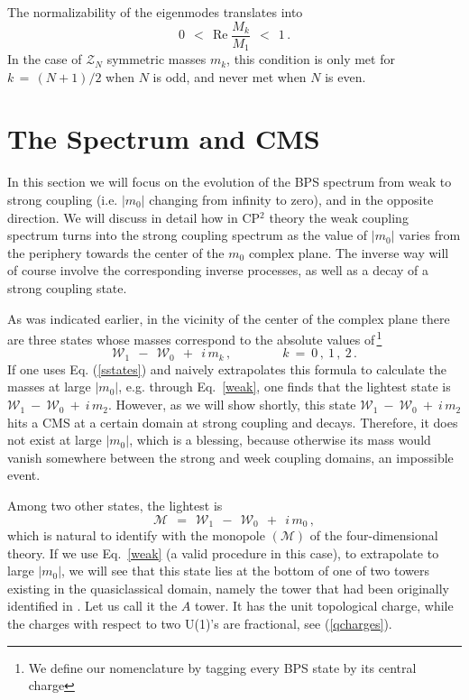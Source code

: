 \documentclass[epsfig,12pt]{article}
\def\beq{\begin{equation}}
\def\eeq{\end{equation}}
\def\beq{\begin{equation}}
\def\eeq{\end{equation}}
\newcommand{\mc}[1]{\mathcal{#1}}
\newcommand{\W}{\mathcal{W}}
\newcommand{\M}{\mathcal{M}}
\begin{document}
	The normalizability of the eigenmodes translates into
\beq
\label{norm}
	0 ~~<~~ \text{Re}\; \frac{ M_k }
                                 { M_1 } ~~<~~ 1\,.
\eeq
	In the case of $ \mc{Z}_N $ symmetric masses $ m_k $, this condition is only met for $ k \,=\, (N+1)/2 $
	when $ N $ is odd, and never met when $ N $ is even.


\newpage
\section{The Spectrum and CMS}
\label{secspectrum}
\setcounter{equation}{0}

	In this section we will focus on the
	evolution of the BPS spectrum from weak to strong coupling (i.e. $|m_0|$ changing from infinity to zero),
	and in the opposite direction.
	We will discuss in detail how in CP$^2$ theory the weak coupling  
	spectrum turns into the strong  coupling  
	spectrum as the value of  $| m_0| $ varies 
	from the periphery towards the center of the $ m_0 $ complex plane.
	The inverse way will of course involve the corresponding inverse processes, as well as a decay of a 
	strong coupling state.

	As was indicated earlier, in the vicinity of the center of the complex plane there are three states
	whose masses correspond to the absolute values of\,\footnote{We define our nomenclature by tagging every BPS state by its central charge}
\beq
\label{sstates}
	\W_1 ~~-~~ \W_0   ~~+~~ i\, m_k\,,   \qquad\qquad k ~=~ 0\,,~1\,,~2\,.
\eeq
	If one uses Eq. (\ref{sstates}) and  naively extrapolates this formula to calculate  the  masses at large $ |m_0| $, e.g. through Eq.~\eqref{weak},
	one  finds that the lightest state is $ \W_1 ~-~ \W_0 ~+~ i\, m_2 $.
	However, as we will show shortly, this state $ \W_1 ~-~ \W_0 ~+~ i\, m_2 $ hits a CMS at a certain domain at strong coupling
	and decays. 
	Therefore, it does not exist at large  $ |m_0| $, which is a blessing, because otherwise
	its mass would vanish somewhere between the strong and week coupling domains, an impossible event.
	
	Among two other  states, the lightest is
\beq
\label{monopole}
	\M ~~=~~ \W_1 ~~-~~ \W_0   ~~+~~ i\, m_0\,,
\eeq
	which is natural to identify with the monopole $ ({\mathcal M}) $ of the four-dimensional theory.
	If we use Eq.~\eqref{weak} (a valid procedure in this case), to extrapolate to
	large $ |m_0| $, we will see that this state lies at the bottom of one of two towers existing 
	in the quasiclassical domain, namely the tower that had been originally identified in \cite{Dorey:1998yh}.
	Let us call it the $A$ tower.  It has the unit topological charge, while the charges with respect to  two U(1)'s  are fractional, see (\ref{qcharges}).
	
\end{document}
